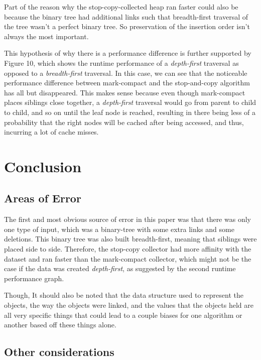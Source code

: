 \documentclass[index]{subfiles}
\begin{document}
Part of the reason why the stop-copy-collected heap ran faster could also be because the binary tree had additional links such that breadth-first traversal of the tree wasn't a perfect binary tree. So preservation of the insertion order isn't always the most important.

This hypothesis of why there is a performance difference is further supported by Figure 10, which shows the runtime performance of a \textit{depth-first} traversal as opposed to a \textit{breadth-first} traversal. In this case, we can see that the noticeable performance difference between mark-compact and the stop-and-copy algorithm has all but disappeared. This makes sense because even though mark-compact places siblings close together, a \textit{depth-first} traversal would go from parent to child to child, and so on until the leaf node is reached, resulting in there being less of a probability that the right nodes will be cached after being accessed, and thus, incurring a lot of cache misses.

\section{Conclusion}

\subsection{Areas of Error}

The first and most obvious source of error in this paper was that there was only one type of input, which was a binary-tree with some extra links and some deletions. This binary tree was also built breadth-first, meaning that siblings were placed side to side. Therefore, the stop-copy collector had more affinity with the dataset and ran faster than the mark-compact collector, which might not be the case if the data was created \textit{depth-first}, as suggested by the second runtime performance graph.

Though, It should also be noted that the data structure used to represent the objects, the way the objects were linked, and the values that the objects held are all very specific things that could lead to a couple biases for one algorithm or another based off these things alone.

\subsection{Other considerations}
\end{document}
